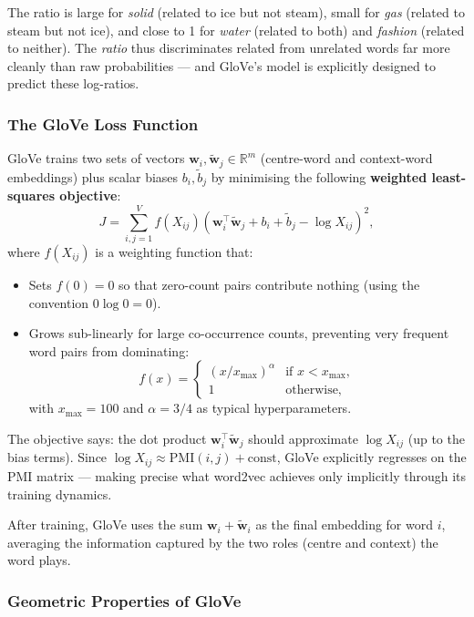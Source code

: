 \documentclass[11pt,a4paper]{article}
\newcommand{\term}[1]{\textcolor{DefGreen}{\textbf{#1}}}
\begin{document}
The ratio is large for \textit{solid} (related to ice but not steam), small for \textit{gas} (related to steam but not ice), and close to 1 for \textit{water} (related to both) and \textit{fashion} (related to neither). The \emph{ratio} thus discriminates related from unrelated words far more cleanly than raw probabilities — and GloVe's model is explicitly designed to predict these log-ratios.

\subsubsection{The GloVe Loss Function}

GloVe trains two sets of vectors $\mathbf{w}_i, \tilde{\mathbf{w}}_j \in \mathbb{R}^m$ (centre-word and context-word embeddings) plus scalar biases $b_i, \tilde{b}_j$ by minimising the following \term{weighted least-squares objective}:
\[
  J = \sum_{i,j=1}^{V} f(X_{ij})\!\left(\mathbf{w}_i^\top \tilde{\mathbf{w}}_j + b_i + \tilde{b}_j - \log X_{ij}\right)^2,
\]
where $f(X_{ij})$ is a weighting function that:
\begin{itemize}
  \item Sets $f(0) = 0$ so that zero-count pairs contribute nothing (using the convention $0\log 0 = 0$).
  \item Grows sub-linearly for large co-occurrence counts, preventing very frequent word pairs from dominating:
  \[
    f(x) = \begin{cases} (x/x_{\max})^\alpha & \text{if } x < x_{\max}, \\ 1 & \text{otherwise,} \end{cases}
  \]
  with $x_{\max} = 100$ and $\alpha = 3/4$ as typical hyperparameters.
\end{itemize}

The objective says: the dot product $\mathbf{w}_i^\top\tilde{\mathbf{w}}_j$ should approximate $\log X_{ij}$ (up to the bias terms). Since $\log X_{ij} \approx \text{PMI}(i,j) + \text{const}$, GloVe explicitly regresses on the PMI matrix — making precise what word2vec achieves only implicitly through its training dynamics.

After training, GloVe uses the sum $\mathbf{w}_i + \tilde{\mathbf{w}}_i$ as the final embedding for word $i$, averaging the information captured by the two roles (centre and context) the word plays.

\subsubsection{Geometric Properties of GloVe}
\end{document}
